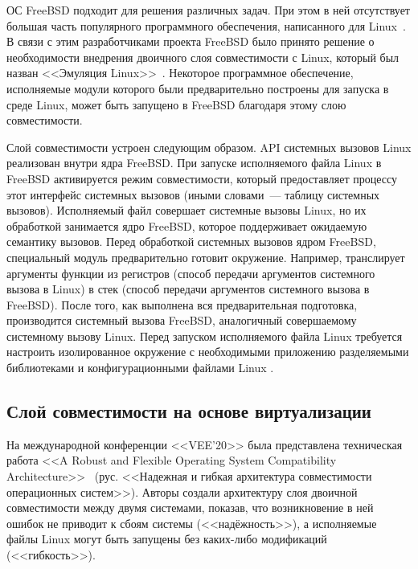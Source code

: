 ОС FreeBSD подходит для решения различных задач. При этом в ней отсутствует большая часть популярного программного обеспечения, написанного для Linux~\cite{freebsd-docs-chapter11}. В связи с этим разработчиками проекта FreeBSD было принято решение о необходимости внедрения двоичного слоя совместимости с Linux, который был назван <<Эмуляция Linux>>~\cite{freebsd-article-linux-emu}\cite{freebsd-docs-chapter11}. Некоторое программное обеспечение, исполняемые модули которого были предварительно построены для запуска в среде Linux, может быть запущено в FreeBSD благодаря этому слою совместимости.

Слой совместимости устроен следующим образом. API системных вызовов Linux реализован внутри ядра FreeBSD. При запуске исполняемого файла Linux в FreeBSD активируется режим совместимости, который предоставляет процессу этот интерфейс системных вызовов (иными словами~--- таблицу системных вызовов). Исполняемый файл совершает системные вызовы Linux, но их обработкой занимается ядро FreeBSD, которое поддерживает ожидаемую семантику вызовов. Перед обработкой системных вызовов ядром FreeBSD, специальный модуль предварительно готовит окружение. Например, транслирует аргументы функции из регистров (способ передачи аргументов системного вызова в Linux) в стек (способ передачи аргументов системного вызова в FreeBSD). После того, как выполнена вся предварительная подготовка, производится системный вызова FreeBSD, аналогичный совершаемому системному вызову Linux. Перед запуском исполняемого файла Linux требуется настроить изолированное окружение с необходимыми приложению разделяемыми библиотеками и конфигурационными файлами Linux \cite{freebsd-docs-chapter11}.


\subsection{Слой совместимости на основе виртуализации}

На международной конференции <<VEE'20>> была представлена техническая работа <<A Robust and Flexible Operating System Compatibility Architecture>>~\cite{acm-vee-article} (рус. <<Надежная и гибкая архитектура совместимости операционных систем>>). Авторы создали архитектуру слоя двоичной совместимости между двумя системами, показав, что возникновение в ней ошибок не приводит к сбоям системы (<<надёжность>>), а исполняемые файлы Linux могут быть запущены без каких-либо модификаций (<<гибкость>>).

